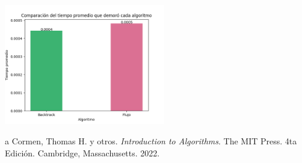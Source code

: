 \documentclass[10pt]{article} %
\begin{document}
	\begin{center}
		\includegraphics[width=7cm]{Bar_comparative_plot.png}
	\end{center}
	
	\begin{thebibliography}
		a
		 Cormen, Thomas H. y otros. \emph{Introduction to Algorithms}. 
		The MIT Press.
		4ta Edici\'on.		
		Cambridge, Massachusetts.
		2022.
	\end{thebibliography}
\end{document}
